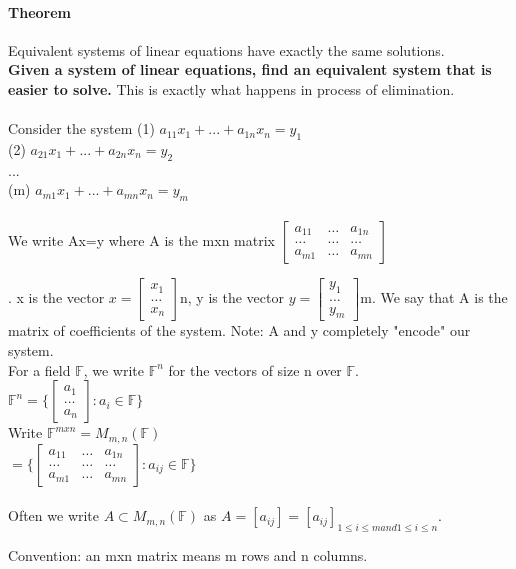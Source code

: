 \documentclass[10pt,letter]{article}
\begin{document}
\paragraph*{Theorem} Equivalent systems of linear equations have exactly the same solutions. \\ 
\textbf{Given a system of linear equations, find an equivalent system that is easier to solve.} This is exactly what happens in process of elimination. \\ \\ 
Consider the system 
(1) $a_{11}x_1 + ... +a_{1n}x_n = y_1$ \\ 
(2) $a_{21}x_1 + ... +a_{2n}x_n = y_2$\\ 
... \\ 
(m) $a_{m1}x_1 + ... +a_{mn}x_n = y_m$ \\\\ 
We write Ax=y where A is the mxn matrix $\begin{bmatrix}
    a_{11}       & \ldots & a_{1n} \\
    \ldots       & \ldots & \ldots \\
    a_{m1}       & \ldots & a_{mn}
\end{bmatrix}$

. x is the vector $x = \begin{bmatrix}
x_1 \\
\ldots \\ 
x_n
\end{bmatrix}$n, y is the vector $y = \begin{bmatrix}
y_1 \\
\ldots \\ 
y_m
\end{bmatrix}$m. We say that A is the matrix of coefficients of the system. Note: A and y completely "encode" our system. \\ 
For a field $\mathbb{F}$, we write $\mathbb{F}^n$ for the vectors of size n over $\mathbb{F}$. \\ 
$\mathbb{F}^n = \{\begin{bmatrix}
a_1 \\
\ldots \\ 
a_n
\end{bmatrix} : a_i \in \mathbb{F}\}$\\ 
Write $\mathbb{F}^{mxn} = M_{m,n}(\mathbb{F})$\\ 
$=\{ \begin{bmatrix}
    a_{11}       & \ldots & a_{1n} \\
    \ldots       & \ldots & \ldots \\
    a_{m1}       & \ldots & a_{mn}
\end{bmatrix}:a_{ij}\in\mathbb{F}\}$\\ \\ 
Often we write $A \subset M_{m,n}(\mathbb{F})$ as $A=[a_{ij}]= [a_{ij}]_{1\leq i\leq m and 1\leq i\leq n}$.

Convention: an mxn matrix means m rows and n columns. 
\end{document}
